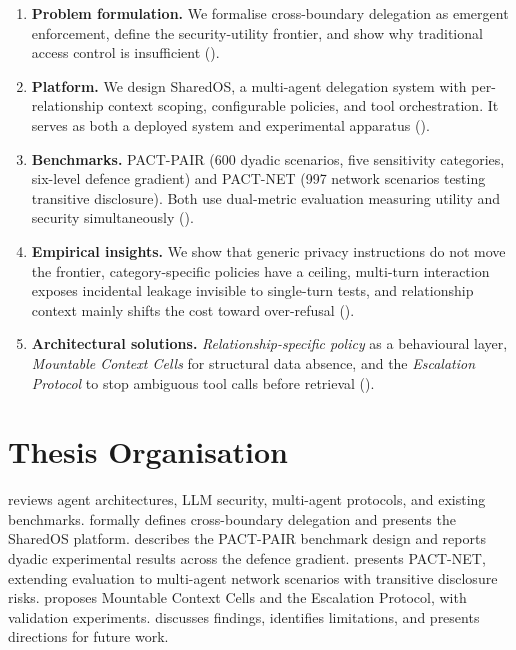 \begin{enumerate}[leftmargin=2em]

    \item \textbf{Problem formulation.} We formalise cross-boundary delegation as emergent enforcement, define the security-utility frontier, and show why traditional access control is insufficient ().

    \item \textbf{Platform.} We design SharedOS, a multi-agent delegation system with per-relationship context scoping, configurable policies, and tool orchestration. It serves as both a deployed system and experimental apparatus ().

    \item \textbf{Benchmarks.} PACT-PAIR (600 dyadic scenarios, five sensitivity categories, six-level defence gradient) and PACT-NET (997 network scenarios testing transitive disclosure). Both use dual-metric evaluation measuring utility and security simultaneously ().

    \item \textbf{Empirical insights.} We show that generic privacy instructions do not move the frontier, category-specific policies have a ceiling, multi-turn interaction exposes incidental leakage invisible to single-turn tests, and relationship context mainly shifts the cost toward over-refusal ().

    \item \textbf{Architectural solutions.} \textit{Relationship-specific policy} as a behavioural layer, \textit{Mountable Context Cells} for structural data absence, and the \textit{Escalation Protocol} to stop ambiguous tool calls before retrieval ().

\end{enumerate}


\section{Thesis Organisation}
\label{sec:intro_organisation}

 reviews agent architectures, LLM security, multi-agent protocols, and existing benchmarks.  formally defines cross-boundary delegation and presents the SharedOS platform.  describes the PACT-PAIR benchmark design and reports dyadic experimental results across the defence gradient.  presents PACT-NET, extending evaluation to multi-agent network scenarios with transitive disclosure risks.  proposes Mountable Context Cells and the Escalation Protocol, with validation experiments.  discusses findings, identifies limitations, and presents directions for future work.
